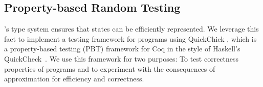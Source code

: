 




\subsection{Property-based Random Testing}\label{sec:rand-testing}

\oqasm's type system ensures that states can be efficiently
represented. We leverage this fact to implement a testing framework
for \oqasm programs using QuickChick \cite{quickchick}, which is
a property-based testing (PBT) framework for Coq in the style of
Haskell's QuickCheck~\cite{10.1145/351240.351266}. We use this
framework for two purposes: To test correctness
properties of \oqasm programs and to experiment with the consequences of
approximation for efficiency and correctness.

